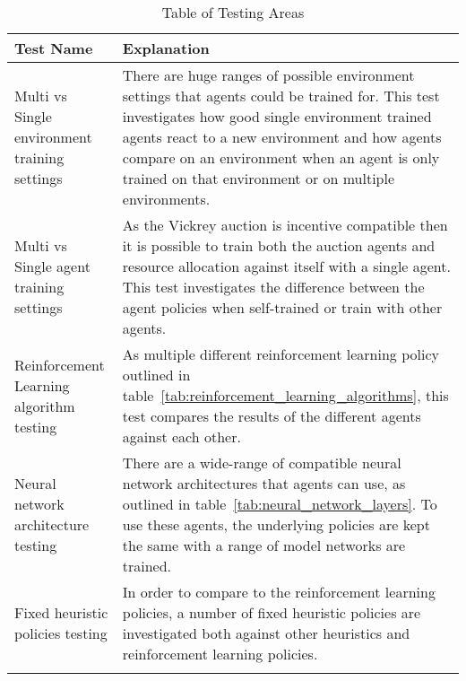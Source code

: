 \begin{longtable}{|p{4cm}|p{10cm}|} \hline
    Test Name & Explanation \\ \hline
    Multi vs Single environment training settings & There are huge ranges of possible environment settings that
        agents could be trained for. This test investigates how good single environment trained agents react to
        a new environment and how agents compare on an environment when an agent is only trained on that
        environment or on multiple environments. \\ \hline
    Multi vs Single agent training settings & As the Vickrey auction is incentive compatible then it is
        possible to train both the auction agents and resource allocation against itself with a single agent. This
        test investigates the difference between the agent policies when self-trained or train with other
        agents. \\ \hline
    Reinforcement Learning algorithm testing & As multiple different reinforcement learning policy outlined in
        table~\ref{tab:reinforcement_learning_algorithms}, this test compares the results of the different agents
        against each other. \\ \hline
    Neural network architecture testing & There are a wide-range of compatible neural network architectures that
        agents can use, as outlined in table~\ref{tab:neural_network_layers}. To use these agents, the underlying
        policies are kept the same with a range of model networks are trained. \\ \hline
    Fixed heuristic policies testing & In order to compare to the reinforcement learning policies, a number of
        fixed heuristic policies are investigated both against other heuristics and reinforcement learning
        policies. \\ \hline
    \caption{Table of Testing Areas}
    \label{tab:testing_areas}
\end{longtable}
